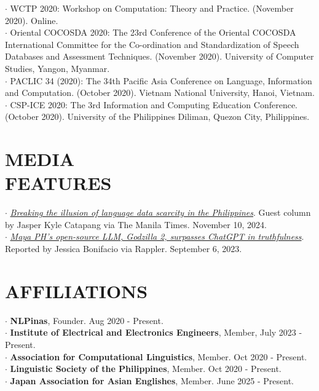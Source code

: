 \documentclass[margin]{res}
\begin{document}
\begin{resume}
$\cdot$ WCTP 2020: Workshop on Computation: Theory and Practice. (November 2020). Online.\\
\newpage
$\cdot$ Oriental COCOSDA 2020: The 23rd Conference of the Oriental COCOSDA International Committee for the Co-ordination and Standardization of Speech Databases and Assessment Techniques. (November 2020). University of Computer Studies, Yangon, Myanmar.\\
$\cdot$ PACLIC 34 (2020): The 34th Pacific Asia Conference on Language, Information and Computation. (October 2020). Vietnam National University, Hanoi, Vietnam.\\
$\cdot$ CSP-ICE 2020: The 3rd Information and Computing Education Conference. (October 2020). University of the Philippines Diliman, Quezon City, Philippines.

\section{MEDIA\\FEATURES}
$\cdot$ \href{https://www.manilatimes.net/2024/11/10/opinion/columns/breaking-the-illusion-of-language-data-scarcity-in-the-philippines/2001098}{\textit{Breaking the illusion of language data scarcity in the Philippines}}. Guest column by Jasper Kyle Catapang via The Manila Times. November 10, 2024.\\
$\cdot$ \href{https://www.rappler.com/technology/maya-philippines-open-source-llm-godzilla-2-surpasses-chatgpt-truthfulness/}{\textit{Maya PH’s open-source LLM, Godzilla 2, surpasses ChatGPT in truthfulness}}. Reported by Jessica Bonifacio via Rappler. September 6, 2023.

\section{AFFILIATIONS}
$\cdot$ \textbf{NLPinas}, Founder. Aug 2020 - Present.\\
$\cdot$ \textbf{Institute of Electrical and Electronics Engineers}, Member, July 2023 - Present.\\
$\cdot$ \textbf{Association for Computational Linguistics}, Member. Oct 2020 - Present.\\
$\cdot$ \textbf{Linguistic Society of the Philippines}, Member. Oct 2020 - Present.\\
$\cdot$ \textbf{Japan Association for Asian Englishes}, Member. June 2025 - Present.


\end{resume}
\end{document}
